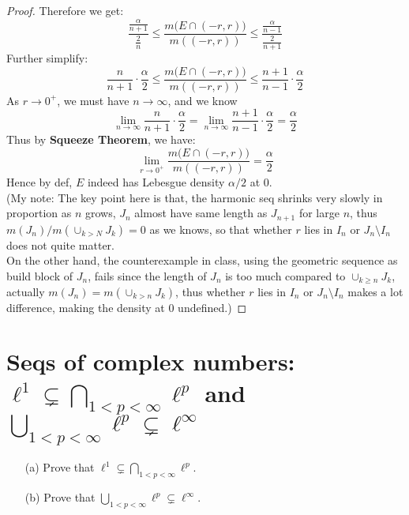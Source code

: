 \documentclass[lang=cn,11pt]{elegantbook}
\begin{document}
\begin{proof}
Therefore we get: \[
   \frac{\frac{\alpha}{n+1}}{\frac{2}{n}}\leq   \frac{m\bigl(E \cap (-r,r)\bigr)}{m((-r,r))} \leq  \frac{\frac{\alpha}{n-1}}{\frac{2}{n+1}}
\]
Further simplify: \[
  \frac{n}{n+1}\cdot  \frac{\alpha}{2} \leq   \frac{m\bigl(E \cap (-r,r)\bigr)}{m((-r,r))} \leq    \frac{n+1}{n-1}\cdot  \frac{\alpha}{2}
\]
As $r\to 0^+$, we must have $n\to \infty$, and we know \[
\lim_{n\to \infty} \frac{n}{n+1} \cdot  \frac{\alpha}{2} = \lim_{n\to \infty} \frac{n+1}{n-1} \cdot  \frac{\alpha}{2}= \frac{\alpha}{2}
\]
Thus by \textbf{Squeeze Theorem}, we have: \[
     \lim_{r\to 0^+}  \frac{m\bigl(E \cap (-r,r)\bigr)}{m((-r,r))}= 
     \frac{\alpha}{2}
   \]
Hence by def, \(E\) indeed has Lebesgue density \(\alpha/2\) at \(0\).\\
(My note: The key point here is that, the harmonic seq shrinks very slowly in proportion as $n$ grows, $J_n$ almost have same length as $J_{n+1}$ for large $n$, thus $m(J_n) / m(\cup_{k> N}J_k) = 0$ as we knows, so that whether $r$ lies in $I_n$ or $J_n \setminus I_n$ does not quite matter. \\
On the other hand, the counterexample in class, using the geometric sequence as build block of $J_n$, fails since the length of $J_n$ is too much compared to $\cup_{k\geq n} J_k$, actually $m(J_n) = m(\cup_{k> n} J_k)$, thus whether $r$ lies in $I_n $ or $J_n \setminus I_n$ makes a lot difference, making the density at $0$ undefined.)
\end{proof}




\section{Seqs of complex numbers: $\ell^1\subsetneq\bigcap_{1<p<\infty}\ell^p$ and $\bigcup_{1<p<\infty}\ell^p\subsetneq\ell^\infty$}
  \begin{itemize}
  \item[(a)]
    Prove that $\ell^1\subsetneq\bigcap_{1<p<\infty}\ell^p$.
  \item[(b)]
    Prove that $\bigcup_{1<p<\infty}\ell^p\subsetneq\ell^\infty$.
  \end{itemize}
    
\end{document}
